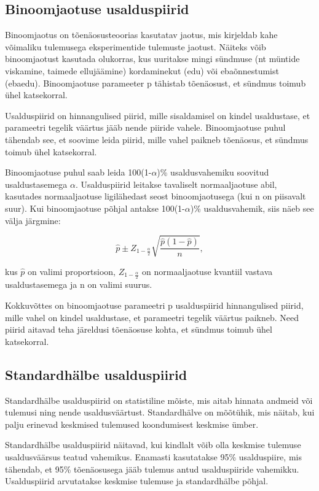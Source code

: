 \documentclass[
]{book}
\begin{document}
\subsection{Binoomjaotuse usalduspiirid}\label{binoomjaotuse-usalduspiirid}

Binoomjaotus on tõenäosusteoorias kasutatav jaotus, mis kirjeldab kahe võimaliku tulemusega eksperimentide tulemuste jaotust. Näiteks võib binoomjaotust kasutada olukorras, kus uuritakse mingi sündmuse (nt müntide viskamine, taimede ellujäämine) kordaminekut (edu) või ebaõnnestumist (ebaedu). Binoomjaotuse parameeter p tähistab tõenäosust, et sündmus toimub ühel katsekorral.

Usalduspiirid on hinnangulised piirid, mille sisaldamisel on kindel usaldustase, et parameetri tegelik väärtus jääb nende piiride vahele. Binoomjaotuse puhul tähendab see, et soovime leida piirid, mille vahel paikneb tõenäosus, et sündmus toimub ühel katsekorral.

Binoomjaotuse puhul saab leida 100(1-\(\alpha\))\% usaldusvahemiku soovitud usaldustasemega \(\alpha\). Usalduspiirid leitakse tavaliselt normaaljaotuse abil, kasutades normaaljaotuse ligilähedast seost binoomjaotusega (kui n on piisavalt suur). Kui binoomjaotuse põhjal antakse 100(1-\(\alpha\))\% usaldusvahemik, siis näeb see välja järgmine:

\[
\hat{p} ± Z_{1-\frac{\alpha}{2}} \sqrt{\frac{\hat{p}(1-\hat{p})}{n}},
\]

kus \(\hat{p}\) on valimi proportsioon, \(Z_{1-\frac{\alpha}{2}}\) on normaaljaotuse kvantiil vastava usaldustasemega ja n on valimi suurus.

Kokkuvõttes on binoomjaotuse parameetri p usalduspiirid hinnangulised piirid, mille vahel on kindel usaldustase, et parameetri tegelik väärtus paikneb. Need piirid aitavad teha järeldusi tõenäosuse kohta, et sündmus toimub ühel katsekorral.

\subsection{Standardhälbe usalduspiirid}\label{standardhuxe4lbe-usalduspiirid}

Standardhälbe usalduspiirid on statistiline mõiste, mis aitab hinnata andmeid või tulemusi ning nende usaldusväärtust. Standardhälve on mõõtühik, mis näitab, kui palju erinevad keskmised tulemused koondumisest keskmise ümber.

Standardhälbe usalduspiirid näitavad, kui kindlalt võib olla keskmise tulemuse usaldusväärsus teatud vahemikus. Enamasti kasutatakse 95\% usalduspiire, mis tähendab, et 95\% tõenäosusega jääb tulemus antud usalduspiiride vahemikku. Usalduspiirid arvutatakse keskmise tulemuse ja standardhälbe põhjal.
\end{document}
